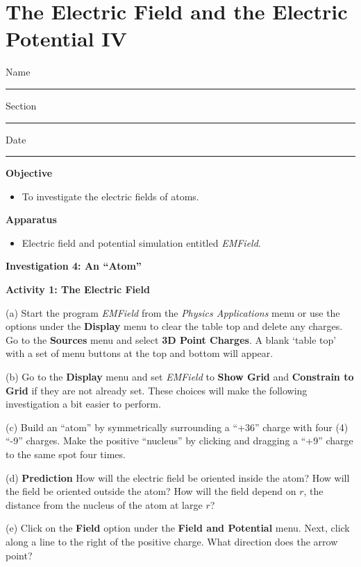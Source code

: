 
\section{The Electric Field and the Electric Potential IV}

Name \rule{2.0in}{0.1pt}\hfill{}Section \rule{1.0in}{0.1pt}\hfill{}Date
\rule{1.0in}{0.1pt}

\textbf{Objective}

\begin{itemize}
\item To investigate the electric fields of atoms.
\end{itemize}

\textbf{Apparatus}

\begin{itemize}
\item Electric field and potential simulation entitled {\it EMField}.
\end{itemize}

\textbf{Investigation 4: An {}``Atom''}

\textbf{Activity 1: The Electric Field}

(a) Start the program {\it EMField} from the {\it Physics Applications} menu or use the options under the 
\textbf{Display} menu to clear the table top and delete any charges.
Go to the \textbf{Sources} menu and select \textbf{3D Point Charges}.
A blank `table top' with a set of menu 
buttons at the top and bottom will appear.

(b) Go to the {\bf Display} menu and set {\it EMField} to
{\bf Show Grid} and {\bf Constrain to Grid} if they are not already set.
These choices will make the following investigation a bit easier to perform.

(c) Build an {}``atom'' by symmetrically surrounding
a {}``+36'' charge with four (4) {}``-9'' charges.
Make the positive ``nucleus'' by clicking and dragging a ``+9'' charge
to the same spot four times.


(d) {\bf Prediction} How will the electric field be oriented inside the atom?
How will the field be oriented outside the atom?
How will the field depend on $r$, the distance from the nucleus of the atom
at large $r$?
\vspace{25mm}

(e) Click on the \textbf{Field} option under the \textbf{Field and Potential} menu.
Next, click along a line to the right of the positive charge.
What direction does the arrow point?
\vspace{15mm}

